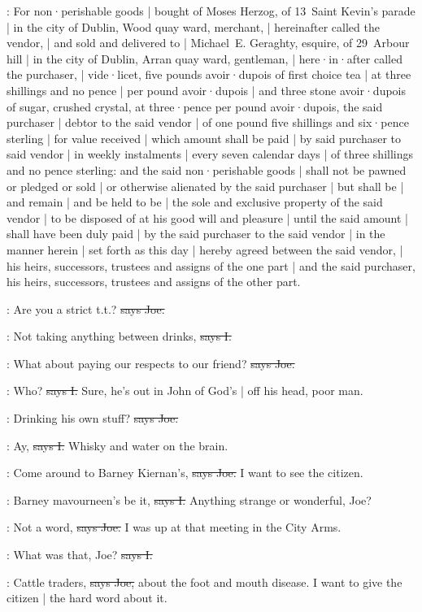 :
For non·perishable goods |
bought of Moses Herzog,
of 13~Saint Kevin's parade |
in the city of Dublin,
Wood quay ward,
merchant, |
hereinafter called the vendor, |
and sold and delivered to |
Michael~E. Geraghty,
esquire,
of 29~Arbour hill |
in the city of Dublin,
Arran quay ward,
gentleman, |
here·in·after called the purchaser, |
vide·licet,
five pounds avoir·dupois of first choice tea |
at three shillings and no pence |
per pound avoir·dupois |
and three stone avoir·dupois of sugar,
crushed crystal,
at three·pence per pound avoir·dupois,
the said purchaser |
debtor to the said vendor |
of one pound five shillings and six·pence sterling |
for value received |
which amount shall be paid |
by said purchaser to said vendor |
in weekly instalments |
every seven calendar days |
of three shillings and no pence sterling:
and the said non·perishable goods |
shall not be pawned or pledged or sold |
or otherwise alienated by the said purchaser |
but shall be |
and remain |
and be held to be |
the sole and exclusive property of the said vendor |
to be disposed of at his good will and pleasure |
until the said amount |
shall have been duly paid |
by the said purchaser to the said vendor |
in the manner herein |
set forth as this day |
hereby agreed between the said vendor, |
his heirs,
successors,
trustees
and assigns of the one part
 |
and the said purchaser,
his heirs,
successors,
trustees
and assigns of the other part.

\joe:
Are you a strict t.t.?
\sout{says Joe.}

:
Not taking anything between drinks,
\sout{says I.}

\joe:
What about paying our respects to our friend?
\sout{says Joe.}

:
Who?
\sout{says I.}
Sure,
he's out in John of God's |
off his head,
poor man.

\joe:
Drinking his own stuff?
\sout{says Joe.}

:
Ay,
\sout{says I.}
Whisky and water on the brain.

\joe:
Come around to Barney Kiernan's,
\sout{says Joe.}
I want to see the citizen.

:
Barney mavourneen's be it,
\sout{says I.}
Anything strange or wonderful,
Joe?

\joe:
Not a word,
\sout{says Joe.}
I was up at that meeting in the City Arms.

:
What was that,
Joe?
\sout{says I.}

\joe:
Cattle traders,
\sout{says Joe,}
about the foot and mouth disease.
I want to give the citizen |
the hard word about it.

